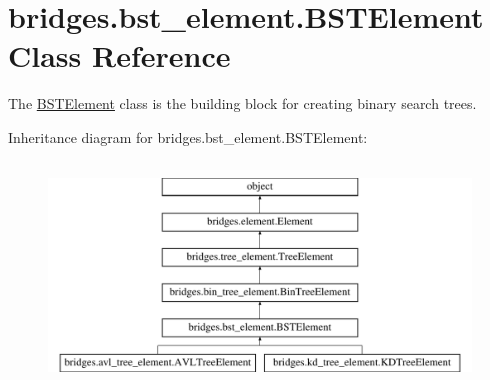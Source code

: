 \hypertarget{classbridges_1_1bst__element_1_1_b_s_t_element}{}\section{bridges.\+bst\+\_\+element.\+B\+S\+T\+Element Class Reference}
\label{classbridges_1_1bst__element_1_1_b_s_t_element}


The \hyperlink{classbridges_1_1bst__element_1_1_b_s_t_element}{B\+S\+T\+Element} class is the building block for creating binary search trees.  


Inheritance diagram for bridges.\+bst\+\_\+element.\+B\+S\+T\+Element\+:\begin{figure}[H]
\begin{center}
\leavevmode
\includegraphics[height=6.000000cm]{classbridges_1_1bst__element_1_1_b_s_t_element}
\end{center}
\end{figure}
